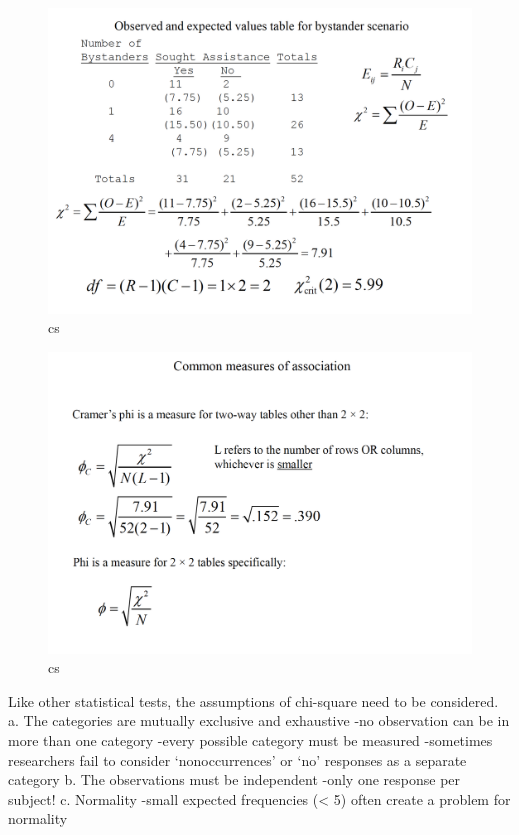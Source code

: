 \documentclass[]{book}
\theoremstyle{definition}
\theoremstyle{definition}
\theoremstyle{definition}
\theoremstyle{remark}
\begin{document}
\begin{figure}
\centering
\includegraphics{img/hickscs7.png}
\caption{cs}
\end{figure}

\begin{figure}
\centering
\includegraphics{img/hickscs8.png}
\caption{cs}
\end{figure}

Like other statistical tests, the assumptions of chi-square need to be
considered. a. The categories are mutually exclusive and exhaustive -no
observation can be in more than one category -every possible category
must be measured -sometimes researchers fail to consider
`nonoccurrences' or `no' responses as a separate category b. The
observations must be independent -only one response per subject! c.
Normality -small expected frequencies (\textless{} 5) often create a
problem for normality
\end{document}
